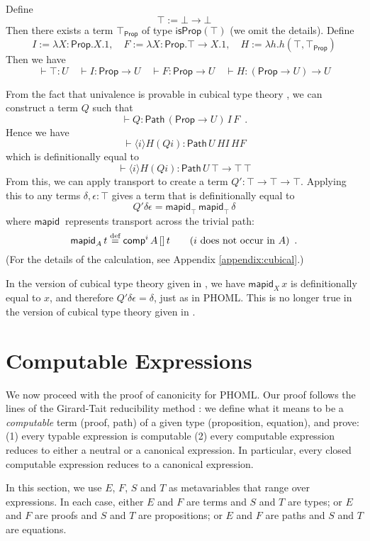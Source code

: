 \documentclass[a4paper,UKenglish]{lipics-v2016}
\newcommand*{\eqdef}{\mathrel{\smash{\stackrel{\text{def}}{=}}}}
\newcommand{\Path}[3]{\ensuremath{\mathsf{Path} \, {#1} \, {#2} \, {#3}}}
\newcommand{\Prop}{\mathsf{Prop}}
\newcommand{\isProp}[1]{\mathsf{isProp} \left( {#1} \right)}
\newcommand{\mapid}[2]{\mathsf{mapid}_{#1} \, {#2}}
\newcommand{\comp}{\mathsf{comp}}
\theoremstyle{plain}
\theoremstyle{definition}
\begin{document}
Define
$$ \top := \bot \rightarrow \bot $$
Then there exists a term $\top_\Prop$ of type $\isProp{\top}$ (we omit the details).  Define
$$ I := \lambda X:\Prop.X.1, \quad F := \lambda X : \Prop.\top \rightarrow X.1, \quad H := \lambda h.h (\top , \top_\Prop) $$
Then we have
$$ \vdash \top : U \quad
\vdash I  : \Prop \rightarrow U \quad
\vdash F  : \Prop \rightarrow U \quad
\vdash H  : (\Prop \rightarrow U) \rightarrow U $$

From the fact that univalence is provable in cubical type theory \cite{cchm:cubical}, we can construct a term $Q$ such that
$$ \vdash Q : \Path{(\Prop \rightarrow U)}{I}{F} \enspace . $$
Hence we have
$$ \vdash \langle i \rangle H (Q i) : \Path{U}{HI}{HF} $$
which is definitionally equal to
$$ \vdash \langle i \rangle H (Q i) : \Path{U}{\top \rightarrow \top}{\top} $$
From this, we can apply transport to create a term $Q' : \top \rightarrow \top \rightarrow \top$.  Applying this to any terms $\delta, \epsilon : \top$ gives a term that
is definitionally equal to
$$ Q' \delta \epsilon = \mapid{\top}{\mapid{\top}{\delta}} $$
where $\mapid{}{}$ represents transport across the trivial path:
$$ \mapid{A}{t} \eqdef \comp^i \, A \, [] \, t \qquad (i \text{ does not occur in } A) \enspace . $$
(For the details of the calculation, see Appendix \ref{appendix:cubical}.)

In the version of cubical type theory given in \cite{bch:cubical}, we have $\mapid{X}{x}$ is definitionally equal to $x$, and therefore $Q' \delta \epsilon = \delta$, just as in PHOML.
This is no longer true in the version of cubical type theory given in \cite{cchm:cubical}.

\section{Computable Expressions}
\label{section:computable}

We now proceed with the proof of canonicity for PHOML.  Our proof follows the lines of the Girard-Tait reducibility method \cite{tait1967}: we define what it means to be a \emph{computable}
term (proof, path) of a given type (proposition, equation), and prove: (1) every typable expression is computable (2) every computable expression reduces to either a neutral or a canonical
expression.  In particular, every closed computable expression reduces to a canonical expression.

In this section, we use $E$, $F$, $S$ and $T$ as metavariables that range over expressions.  In each case, either $E$ and $F$ are terms and $S$ and $T$ are types; or $E$ and $F$ are
proofs and $S$ and $T$ are propositions; or $E$ and $F$ are paths and $S$ and $T$ are equations.
\end{document}
